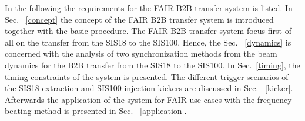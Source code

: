 In the following the requirements for the FAIR B2B transfer system is listed. In Sec. ~\ref{concept} the concept of the FAIR B2B transfer system is introduced together with the basic procedure. The FAIR B2B transfer system focus first of all on the transfer from the SIS18 to the SIS100. Hence, the Sec. ~\ref{dynamics} is concerned with the analysis of two synchronization methods from the beam dynamics for the B2B transfer from the SIS18 to the SIS100. In Sec.~\ref{timing}, the timing constraints of the system is presented. The different trigger scenarios of the SIS18 extraction and SIS100 injection kickers are discussed in Sec. ~\ref{kicker}. Afterwards the application of the system for FAIR use cases with the frequency beating method is presented in Sec. ~\ref{application}.


